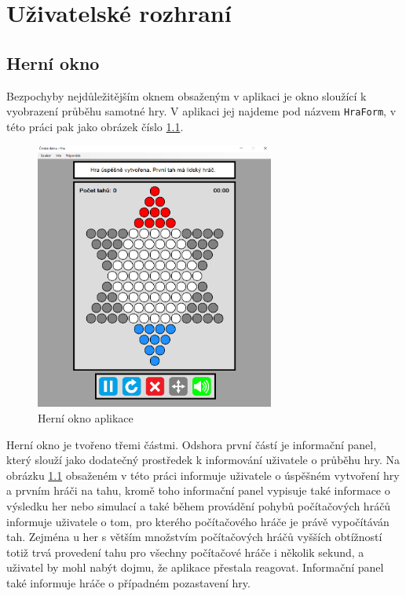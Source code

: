 \chapter{Uživatelské rozhraní}
\section{Herní okno}
Bezpochyby nejdůležitějším oknem obsaženým v aplikaci je okno sloužící k vyobrazení průběhu samotné hry. V aplikaci jej najdeme pod názvem \lstinline$HraForm$, v této práci pak jako obrázek číslo \ref{fig:HerniOkno}.

\begin{figure}
	\centering
	\includegraphics[width=0.7\textwidth]{Figures/HerniOkno.png}
	\caption{Herní okno aplikace}
    \label{fig:HerniOkno}
\end{figure}

Herní okno je tvořeno třemi částmi. Odshora první částí je informační panel, který slouží jako dodatečný prostředek k informování uživatele o průběhu hry. Na obrázku \ref{fig:HerniOkno} obsaženém v této práci informuje uživatele o úspěšném vytvoření hry a prvním hráči na tahu, kromě toho informační panel vypisuje také informace o výsledku her nebo simulací a také během provádění pohybů počítačových hráčů informuje uživatele o tom, pro kterého počítačového hráče je právě vypočítáván tah. Zejména u her s větším množstvím počítačových hráčů vyšších obtížností totiž trvá provedení tahu pro všechny počítačové hráče i několik sekund, a uživatel by mohl nabýt dojmu, že aplikace přestala reagovat. Informační panel také informuje hráče o případném pozastavení hry.

